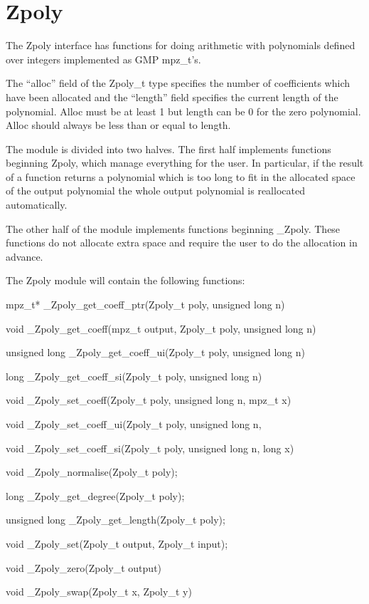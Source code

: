 \documentclass[a4paper,10pt]{article}
\begin{document}
\section{Zpoly}
The Zpoly interface has functions for doing arithmetic with polynomials defined over integers implemented as GMP mpz\_t's. 

The ``alloc'' field of the Zpoly\_t type specifies the number of coefficients which have been allocated and the ``length'' field specifies the current length of the polynomial. Alloc must be at least 1 but length can be 0 for the zero polynomial. Alloc should always be less than or equal to length.

The module is divided into two halves. The first half implements functions beginning Zpoly, which manage everything for the user. In particular, if the result of a function returns a polynomial which is too long to fit in the allocated space of the output polynomial the whole output polynomial is reallocated automatically.

The other half of the module implements functions beginning \_Zpoly. These functions do not allocate extra space and require the user to do the allocation in advance.

The Zpoly module will contain the following functions:

mpz\_t* \_Zpoly\_get\_coeff\_ptr(Zpoly\_t poly, unsigned long n)

void \_Zpoly\_get\_coeff(mpz\_t output, Zpoly\_t poly, unsigned long n)

unsigned long \_Zpoly\_get\_coeff\_ui(Zpoly\_t poly, unsigned long n)

long \_Zpoly\_get\_coeff\_si(Zpoly\_t poly, unsigned long n)

void \_Zpoly\_set\_coeff(Zpoly\_t poly, unsigned long n, mpz\_t x)

void \_Zpoly\_set\_coeff\_ui(Zpoly\_t poly, unsigned long n,

void \_Zpoly\_set\_coeff\_si(Zpoly\_t poly, unsigned long n, long x)

void \_Zpoly\_normalise(Zpoly\_t poly);

long \_Zpoly\_get\_degree(Zpoly\_t poly);

unsigned long \_Zpoly\_get\_length(Zpoly\_t poly);

void \_Zpoly\_set(Zpoly\_t output, Zpoly\_t input);

void \_Zpoly\_zero(Zpoly\_t output)

void \_Zpoly\_swap(Zpoly\_t x, Zpoly\_t y)
\end{document}

